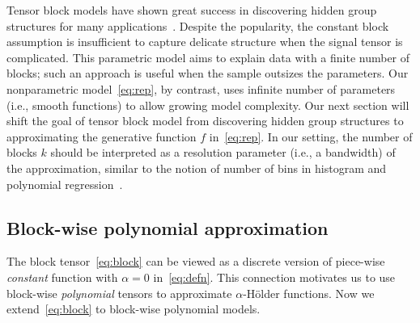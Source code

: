 \documentclass[11pt]{article}
\theoremstyle{definition}
\begin{document}
Tensor block models have shown great success in discovering hidden group structures for many applications~\citep{wang2019multiway,han2020exact}. Despite the popularity, the constant block assumption is insufficient to capture delicate structure when the signal tensor is complicated. 
This parametric model aims to explain data with a finite number of blocks; such an approach is useful when the sample outsizes the parameters. Our nonparametric model~\eqref{eq:rep}, by contrast, uses infinite number of parameters (i.e., smooth functions) to allow growing model complexity. Our next section will shift the goal of tensor block model from discovering hidden group structures to approximating the generative function $f$ in~\eqref{eq:rep}. In our setting, the number of blocks $k$ should be interpreted as a resolution parameter (i.e., a bandwidth) of the approximation, similar to the notion of number of bins in histogram and polynomial regression~\citep{wasserman2006all}. 

\subsection{Block-wise polynomial approximation}\label{sec:poly}
The block tensor~\eqref{eq:block} can be viewed as a discrete version of piece-wise \emph{constant} function with $\alpha=0$ in~\eqref{eq:defn}. This connection motivates us to use block-wise \emph{polynomial} tensors to approximate $\alpha$-H\"older functions. Now we extend~\eqref{eq:block} to block-wise polynomial models. 
\end{document}
